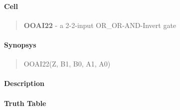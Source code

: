 \label{OOAI22}
\paragraph{Cell}
\begin{quote}
    \textbf{OOAI22} - a 2-2-input OR_OR-AND-Invert gate
\end{quote}

\paragraph{Synopsys}
\begin{quote}
    OOAI22(Z, B1, B0, A1, A0)
\end{quote}

\paragraph{Description}



\paragraph{Truth Table}



